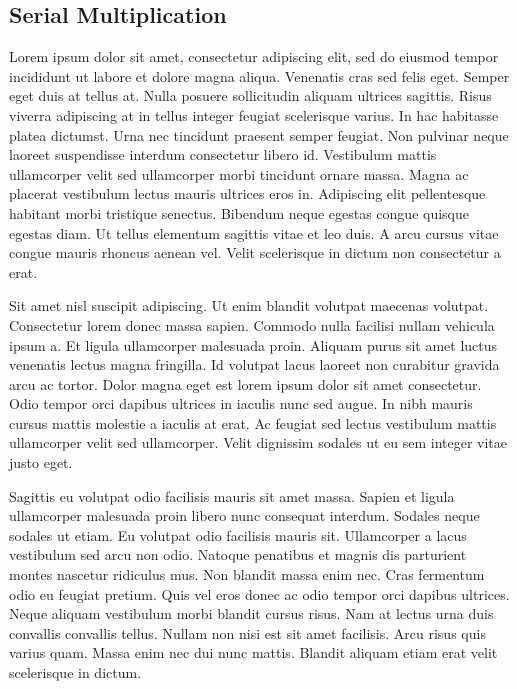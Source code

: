 \documentclass[12pt]{article}
\begin{document}
\subsection{Serial Multiplication}
Lorem ipsum dolor sit amet, consectetur adipiscing elit, sed do eiusmod tempor incididunt ut labore et dolore magna aliqua. Venenatis cras sed felis eget. Semper eget duis at tellus at. Nulla posuere sollicitudin aliquam ultrices sagittis. Risus viverra adipiscing at in tellus integer feugiat scelerisque varius. In hac habitasse platea dictumst. Urna nec tincidunt praesent semper feugiat. Non pulvinar neque laoreet suspendisse interdum consectetur libero id. Vestibulum mattis ullamcorper velit sed ullamcorper morbi tincidunt ornare massa. Magna ac placerat vestibulum lectus mauris ultrices eros in. Adipiscing elit pellentesque habitant morbi tristique senectus. Bibendum neque egestas congue quisque egestas diam. Ut tellus elementum sagittis vitae et leo duis. A arcu cursus vitae congue mauris rhoncus aenean vel. Velit scelerisque in dictum non consectetur a erat.\par
Sit amet nisl suscipit adipiscing. Ut enim blandit volutpat maecenas volutpat. Consectetur lorem donec massa sapien. Commodo nulla facilisi nullam vehicula ipsum a. Et ligula ullamcorper malesuada proin. Aliquam purus sit amet luctus venenatis lectus magna fringilla. Id volutpat lacus laoreet non curabitur gravida arcu ac tortor. Dolor magna eget est lorem ipsum dolor sit amet consectetur. Odio tempor orci dapibus ultrices in iaculis nunc sed augue. In nibh mauris cursus mattis molestie a iaculis at erat. Ac feugiat sed lectus vestibulum mattis ullamcorper velit sed ullamcorper. Velit dignissim sodales ut eu sem integer vitae justo eget.\par
Sagittis eu volutpat odio facilisis mauris sit amet massa. Sapien et ligula ullamcorper malesuada proin libero nunc consequat interdum. Sodales neque sodales ut etiam. Eu volutpat odio facilisis mauris sit. Ullamcorper a lacus vestibulum sed arcu non odio. Natoque penatibus et magnis dis parturient montes nascetur ridiculus mus. Non blandit massa enim nec. Cras fermentum odio eu feugiat pretium. Quis vel eros donec ac odio tempor orci dapibus ultrices. Neque aliquam vestibulum morbi blandit cursus risus. Nam at lectus urna duis convallis convallis tellus. Nullam non nisi est sit amet facilisis. Arcu risus quis varius quam. Massa enim nec dui nunc mattis. Blandit aliquam etiam erat velit scelerisque in dictum.\par
\end{document}
